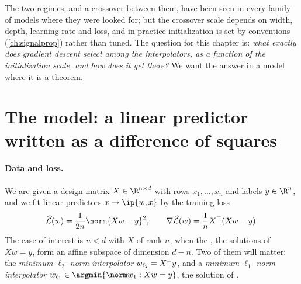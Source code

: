 \begin{refsection}
The two regimes, and a crossover between them, have been seen in every family of models where they were looked for; but the crossover scale depends on width, depth, learning rate and loss, and in practice initialization is set by conventions (\cref{ch:signalprop}) rather than tuned. The question for this chapter is: \emph{what exactly does gradient descent select among the interpolators, as a function of the initialization scale, and how does it get there?} We want the answer in a model where it is a theorem.

\section{The model: a linear predictor written as a difference of squares}\label{sec:diagonal:model}

\paragraph{Data and loss.} We are given a design matrix $X\in\R^{n\times d}$ with rows $x_1,\dots,x_n$ and labels $y\in\R^n$, and we fit linear predictors $x\mapsto\ip{w,x}$ by the training loss
\begin{equation}\label{eq:diagonal:loss}
  \Lhat(w)=\frac1{2n}\norm{Xw-y}^2,\qquad \nabla\Lhat(w)=\frac1nX^\top(Xw-y).
\end{equation}
The case of interest is $n<d$ with $X$ of rank $n$, when the , the solutions of $Xw=y$, form an affine subspace of dimension $d-n$. Two of them will matter: the \emph{minimum-$\ell_2$-norm interpolator} $w_{\ell_{2}}=X^+y$, and a \emph{minimum-$\ell_1$-norm interpolator} $\diagwl1\in\argmin\{\norm w_1:Xw=y\}$, the  solution of \textcite{ChenDonohoSaunders1998}.


\end{refsection}
